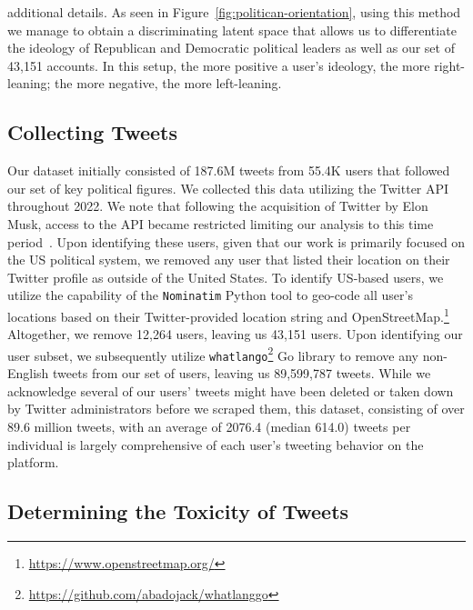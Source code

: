  additional details. As seen in Figure~\ref{fig:politican-orientation}, using this method we manage to obtain a discriminating latent space that allows us to differentiate the ideology of Republican and Democratic political leaders as well as our set of 43,151 accounts. In this setup, the more positive a user's ideology, the more right-leaning; the more negative, the more left-leaning.  

\subsection{Collecting Tweets}
Our dataset initially consisted of 187.6M tweets from 55.4K users that followed our set of key political figures. We collected this data utilizing the Twitter API throughout 2022. We note that following the acquisition of Twitter by Elon Musk, access to the API became restricted limiting our analysis to this time period~\cite{Singh2023}.  Upon identifying these users, given that our work is primarily focused on the US political system, we removed any user that listed their location on their Twitter profile as outside of the United States. To identify US-based users, we utilize the capability of the \texttt{Nominatim} Python tool to geo-code all user's locations based on their Twitter-provided location string and OpenStreetMap.\footnote{\url{https://www.openstreetmap.org/}} Altogether, we remove 12,264 users, leaving us 43,151 users. Upon identifying our user subset, we subsequently utilize \texttt{whatlango}\footnote{\url{https://github.com/abadojack/whatlanggo}} Go library to remove any non-English tweets from our set of users, leaving us 89,599,787 tweets. While we acknowledge several of our users' tweets might have been deleted or taken down by Twitter administrators before we scraped them, this dataset, consisting of over 89.6 million tweets, with an average of 2076.4 (median 614.0) tweets per individual is largely comprehensive of each user's tweeting behavior on the platform.




\subsection{Determining the Toxicity of Tweets\label{sec:labeling-toxic}}

